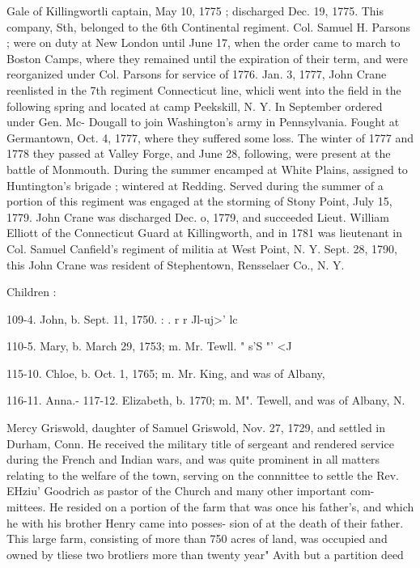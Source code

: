 \documentclass[oneside]{book}
\begin{document}
Gale of Killingwortli captain, May 10, 1775 ; discharged Dec. 
19, 1775. This company, Sth, belonged to the 6th Continental 
regiment. Col. Samuel H. Parsons ; were on duty at New London 
until June 17, when the order came to march to Boston Camps, 
where they remained until the expiration of their term, and were 
reorganized under Col. Parsons for service of 1776. Jan. 3, 
1777, John Crane reenlisted in the 7th regiment Connecticut line, 
whicli went into the field in the following spring and located at 
camp Peekskill, N. Y. In September ordered under Gen. Mc- 
Dougall to join Washington's army in Pennsylvania. Fought at 
Germantown, Oct. 4, 1777, where they suffered some loss. The 
winter of 1777 and 1778 they passed at Valley Forge, and June 
28, following, were present at the battle of Monmouth. During 
the summer encamped at White Plains, assigned to Huntington's 
brigade ; wintered at Redding. Served during the summer of 
a portion of this regiment was engaged at the storming of Stony 
Point, July 15, 1779. John Crane was discharged Dec. o, 1779, 
and succeeded Lieut. William Elliott of the Connecticut Guard at 
Killingworth, and in 1781 was lieutenant in Col. Samuel Canfield's 
regiment of militia at West Point, N. Y. Sept. 28, 1790, this 
John Crane was resident of Stephentown, Rensselaer Co., N. Y. 

Children : 




109-4. John, b. Sept. 11, 1750. : . r r Jl-uj>' lc 

110-5. Mary, b. March 29, 1753; m. Mr. Tewll. " s'S "' <J 




115-10. Chloe, b. Oct. 1, 1765; m. Mr. King, and was of Albany, 

116-11. Anna.- 
117-12. Elizabeth, b. 1770; m. M". Tewell, and was of Albany, N. 


Mercy Griswold, daughter of Samuel Griswold, Nov. 27, 1729, 
and settled in Durham, Conn. He received the military title of 
sergeant and rendered service during the French and Indian wars, 
and was quite prominent in all matters relating to the welfare of 
the town, serving on the connnittee to settle the Rev. EHziu' 
Goodrich as pastor of the Church and many other important com- 
mittees. He resided on a portion of the farm that was once his 
father's, and which he with his brother Henry came into posses- 
sion of at the death of their father. This large farm, consisting 
of more than 750 acres of land, was occupied and owned by tliese 
two brotliers more than twenty year" Avith but a partition deed 
\end{document}
